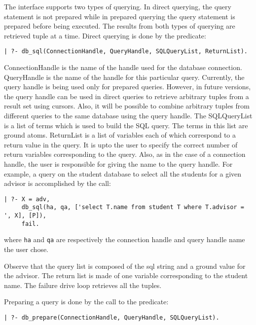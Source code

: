 The interface supports two types of querying. In direct querying, the
query statement is not prepared while in prepared querying the query
statement is prepared before being executed. The results from
both types of querying are retrieved tuple at a time.
Direct querying is done by the predicate:

\begin{verbatim}
| ?- db_sql(ConnectionHandle, QueryHandle, SQLQueryList, ReturnList).
\end{verbatim}

ConnectionHandle is the name of the handle used for the database connection.
QueryHandle is the name of the handle for this particular query. 
Currently, the query handle is being used only for prepared queries. 
However, in future versions, the query handle can be used in direct
queries to retrieve arbitrary tuples from a result set using cursors.
Also, it will be possible to combine arbitrary tuples from different 
queries to the same database using the query handle.
The SQLQueryList is a list of terms which is used to build the SQL query.
The terms in this list are ground atoms. ReturnList is a list of 
variables each of which correspond to a return value in the query.
It is upto the user to specify the correct number of return variables 
corresponding to the query. Also, as in the case of a connection handle, 
the user is responsible for giving the name to the query handle.
For example, a query on the student database to select all the students
for a given advisor is accomplished by the call:

\begin{verbatim}
| ?- X = adv,
     db_sql(ha, qa, ['select T.name from student T where T.advisor = ', X], [P]),
     fail.
\end{verbatim}

\noindent
where {\tt ha} and {\tt qa} are respectively the connection handle and query
handle name the user chose.

Observe that the query list is composed of the sql string and a ground value
for the advisor. The return list is made of one variable corresponding to
the student name. The failure drive loop retrieves all the tuples.

Preparing a  query is done by the call to the predicate:

\begin{verbatim}
| ?- db_prepare(ConnectionHandle, QueryHandle, SQLQueryList).
\end{verbatim}

